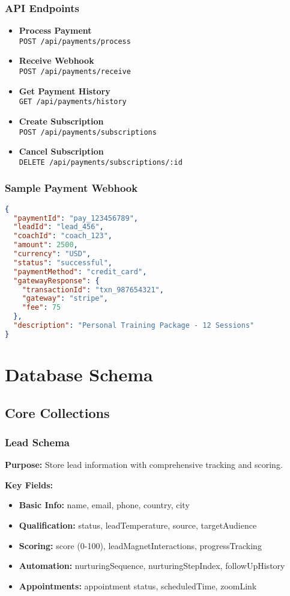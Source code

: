 \documentclass[12pt,a4paper]{article}
\newcommand{\apiendpoint}[2]{\textbf{#1} \\ \texttt{#2}}
\newcommand{\samplecode}[1]{\begin{lstlisting}[language=JSON]#1\end{lstlisting}}
\begin{document}
\subsubsection{API Endpoints}
\begin{itemize}
    \item \apiendpoint{Process Payment}{POST /api/payments/process}
    \item \apiendpoint{Receive Webhook}{POST /api/payments/receive}
    \item \apiendpoint{Get Payment History}{GET /api/payments/history}
    \item \apiendpoint{Create Subscription}{POST /api/payments/subscriptions}
    \item \apiendpoint{Cancel Subscription}{DELETE /api/payments/subscriptions/:id}
\end{itemize}

\subsubsection{Sample Payment Webhook}
\samplecode{
{
  "paymentId": "pay_123456789",
  "leadId": "lead_456",
  "coachId": "coach_123",
  "amount": 2500,
  "currency": "USD",
  "status": "successful",
  "paymentMethod": "credit_card",
  "gatewayResponse": {
    "transactionId": "txn_987654321",
    "gateway": "stripe",
    "fee": 75
  },
  "description": "Personal Training Package - 12 Sessions"
}
}

\section{Database Schema}

\subsection{Core Collections}

\subsubsection{Lead Schema}
\textbf{Purpose:} Store lead information with comprehensive tracking and scoring.

\textbf{Key Fields:}
\begin{itemize}
    \item \textbf{Basic Info:} name, email, phone, country, city
    \item \textbf{Qualification:} status, leadTemperature, source, targetAudience
    \item \textbf{Scoring:} score (0-100), leadMagnetInteractions, progressTracking
    \item \textbf{Automation:} nurturingSequence, nurturingStepIndex, followUpHistory
    \item \textbf{Appointments:} appointment status, scheduledTime, zoomLink
\end{itemize}
\end{document}
